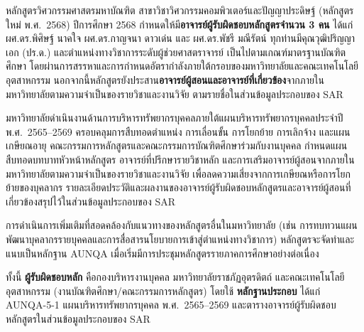 


หลักสูตรวิศวกรรมศาสตรมหาบัณฑิต สาขาวิชาวิศวกรรมคอมพิวเตอร์และปัญญาประดิษฐ์ (หลักสูตรใหม่ พ.ศ.~2568) ปีการศึกษา 2568 กำหนดให้มี\textbf{อาจารย์ผู้รับผิดชอบหลักสูตรจำนวน 3 คน} ได้แก่ ผศ.ดร.พิศิษฐ์ นาคใจ ผศ.ดร.กาญจนา ดาวเด่น และ ผศ.ดร.พัชรี มณีรัตน์ ทุกท่านมีคุณวุฒิปริญญาเอก (ปร.ด.) และตำแหน่งทางวิชาการระดับผู้ช่วยศาสตราจารย์ เป็นไปตามเกณฑ์มาตรฐานบัณฑิตศึกษา โดยผ่านการสรรหาและการกำหนดอัตรากำลังภายใต้กรอบของมหาวิทยาลัยและคณะเทคโนโลยีอุตสาหกรรม นอกจากนี้หลักสูตรยังประสาน\textbf{อาจารย์ผู้สอนและอาจารย์ที่เกี่ยวข้อง}จากภายในมหาวิทยาลัยตามความจำเป็นของรายวิชาและงานวิจัย ตามรายชื่อในส่วนข้อมูลประกอบของ SAR

มหาวิทยาลัยดำเนินงานด้านการบริหารทรัพยากรบุคคลภายใต้แผนบริหารทรัพยากรบุคคลประจำปี พ.ศ.~2565--2569 ครอบคลุมการสืบทอดตำแหน่ง การเลื่อนขั้น การโยกย้าย การเลิกจ้าง และแผนเกษียณอายุ คณะกรรมการหลักสูตรและคณะกรรมการบัณฑิตศึกษาร่วมกับงานบุคคล กำหนดแผนสืบทอดบทบาทหัวหน้าหลักสูตร อาจารย์ที่ปรึกษารายวิชาหลัก และการเสริมอาจารย์ผู้สอนจากภายในมหาวิทยาลัยตามความจำเป็นของรายวิชาและงานวิจัย เพื่อลดความเสี่ยงจากการเกษียณหรือการโยกย้ายของบุคลากร รายละเอียดประวัติและผลงานของอาจารย์ผู้รับผิดชอบหลักสูตรและอาจารย์ผู้สอนที่เกี่ยวข้องสรุปไว้ในส่วนข้อมูลประกอบของ SAR

การดำเนินการเพิ่มเติมที่สอดคล้องกับแนวทางของหลักสูตรอื่นในมหาวิทยาลัย (เช่น การทบทวนแผนพัฒนาบุคลากรรายบุคคลและการสื่อสารนโยบายการเข้าสู่ตำแหน่งทางวิชาการ) หลักสูตรจะจัดทำและแนบเป็นหลักฐาน AUNQA เมื่อเริ่มมีการประชุมหลักสูตรรายภาคการศึกษาอย่างต่อเนื่อง

ทั้งนี้ \textbf{ผู้รับผิดชอบหลัก} คือกองบริหารงานบุคคล มหาวิทยาลัยราชภัฏอุตรดิตถ์ และคณะเทคโนโลยีอุตสาหกรรม (งานบัณฑิตศึกษา/คณะกรรมการหลักสูตร) โดยใช้ \textbf{หลักฐานประกอบ} ได้แก่ AUNQA-5-1 แผนบริหารทรัพยากรบุคคล พ.ศ.~2565--2569 และตารางอาจารย์ผู้รับผิดชอบหลักสูตรในส่วนข้อมูลประกอบของ SAR

